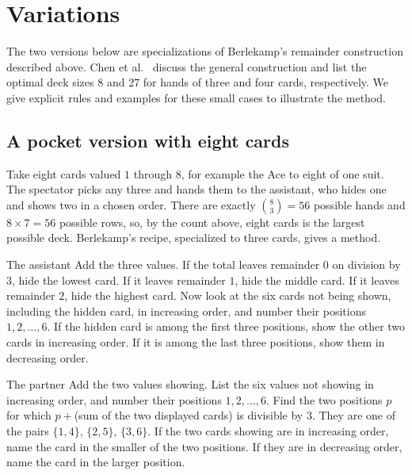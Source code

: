 \documentclass[11pt]{article}
\begin{document}
\section{Variations}
\label{sec:variations}

The two versions below are specializations of Berlekamp's
remainder construction described above. Chen et al.\
\cite[Sections~2.3.1--2.3.2, Theorem~3 and Table~3]{PRIMES}
discuss the general construction and list the optimal deck
sizes $8$ and $27$ for hands of three and four cards,
respectively. We give explicit rules and examples for these
small cases to illustrate the method.

\subsection*{A pocket version with eight cards}

Take eight cards valued $1$ through $8$, for example the Ace to eight of one suit. The spectator picks any three and hands them to the assistant, who hides one and shows two in a chosen order.
There are exactly $\binom{8}{3}=56$ possible hands and $8 \times 7 = 56$ possible rows, so, by the count above, eight cards is the largest possible deck.
Berlekamp's recipe, specialized to three cards, gives a method.

\begin{rulebox}{The assistant}
Add the three values. If the total leaves remainder $0$ on division by $3$, hide the lowest card. If it leaves remainder $1$, hide the middle card. If it leaves remainder $2$, hide the highest card. Now look at the six cards not being shown, including the hidden card, in increasing order, and number their positions $1,2,\ldots,6$. If the hidden card is among the first three positions, show the other two cards in increasing order. If it is among the last three positions, show them in decreasing order.
\end{rulebox}

\begin{rulebox}{The partner}
Add the two values showing. List the six values not showing in increasing order, and number their positions $1,2,\ldots,6$. Find the two positions $p$ for which $p+{}$(sum of the two displayed cards) is divisible by $3$. They are one of the pairs $\{1,4\}$, $\{2,5\}$, $\{3,6\}$. If the two cards showing are in increasing order, name the card in the smaller of the two positions. If they are in decreasing order, name the card in the larger position.
\end{rulebox}
\end{document}
